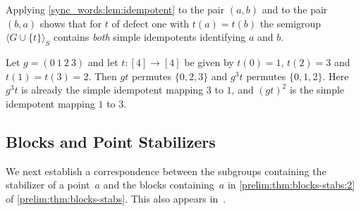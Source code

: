 Applying \cref{sync_words:lem:idempotent} to the pair $(a,b)$ and to the pair $(b,a)$ shows that
for $t$ of defect one with $t(a) = t(b)$ the semigroup $\langle G \cup \{t\} \rangle_S$
contains \emph{both} simple idempotents identifying $a$ and $b$.

\begin{example}
	Let $g = (0 ~ 1 ~ 2 ~ 3)$ and let $t \colon [4] \to [4]$ be given by
	$t(0) = 1$, $t(2) = 3$ and $t(1) = t(3) = 2$.
	Then $gt$ permutes $\{0,2,3\}$ and $g^3 t$ permutes $\{0,1,2\}$.
	Here $g^3 t$ is already the simple idempotent mapping $3$ to $1$,
	and $(gt)^2$ is the simple idempotent mapping $1$ to $3$.
\end{example}

\subsection{Blocks and Point Stabilizers}
\label{prelim:perm:subsec:blocks-stabs}

We next establish a correspondence between the subgroups containing the stabilizer of a point~$a$
and the blocks containing~$a$ in \cref{prelim:thm:blocks-stabs:2} of \cref{prelim:thm:blocks-stabs}. This also appears
in~\cite[Thm.~1.5A]{dixon1996permutation}.

